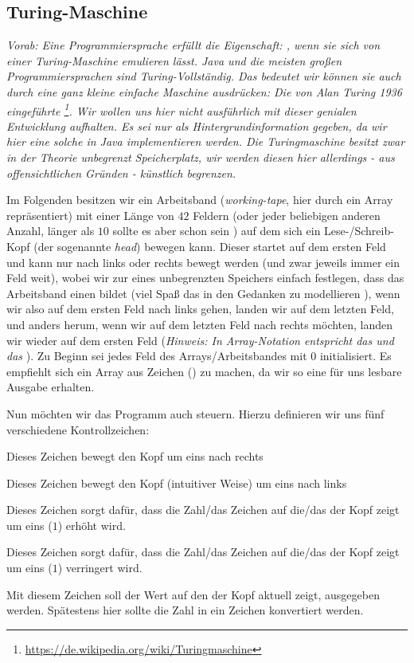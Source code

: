 \documentclass[table]{sopra-base}
\let\T\texttt
\begin{document}
\subsection{Turing-Maschine}
\label{sec:turing}
\textit{Vorab: Eine Programmiersprache erfüllt die Eigenschaft: , wenn sie sich von einer Turing-Maschine emulieren lässt. Java und die meisten großen Programmiersprachen sind Turing-Vollständig. Das bedeutet wir können sie auch durch eine ganz kleine einfache Maschine ausdrücken: Die von Alan Turing 1936 eingeführte \footnote{\url{https://de.wikipedia.org/wiki/Turingmaschine}}. Wir wollen uns hier nicht ausführlich mit dieser genialen Entwicklung aufhalten. Es sei nur als Hintergrundinformation gegeben, da wir hier eine solche in Java implementieren werden. Die Turingmaschine besitzt zwar in der Theorie unbegrenzt Speicherplatz, wir werden diesen hier allerdings - aus offensichtlichen Gründen - künstlich begrenzen.}\par{}

Im Folgenden besitzen wir ein Arbeitsband (\emph{working-tape}, hier durch ein Array repräsentiert) mit einer Länge von $42$ Feldern (oder jeder beliebigen anderen Anzahl, länger als $10$ sollte es aber schon sein \Tongey) auf dem sich ein Lese-/Schreib-Kopf (der sogenannte \emph{head}) bewegen kann. Dieser startet auf dem ersten Feld und kann nur nach links oder rechts bewegt werden (und zwar jeweils immer ein Feld weit), wobei wir zur
 eines unbegrenzten Speichers einfach festlegen, dass das Arbeitsband einen  bildet (viel Spaß das in den Gedanken zu modellieren \Laughey), wenn wir also auf dem ersten Feld nach links gehen, landen wir auf dem letzten Feld, und anders herum, wenn wir auf dem letzten Feld nach rechts möchten, landen wir wieder auf dem ersten Feld (\textit{Hinweis: In Array-Notation entspricht das   und das  }).
Zu Beginn sei jedes Feld des Arrays/Arbeitsbandes mit $0$ initialisiert. Es empfiehlt sich ein Array aus Zeichen () zu machen, da wir so eine für uns lesbare Ausgabe erhalten.\par{}
Nun möchten wir das Programm auch steuern. Hierzu definieren wir uns fünf verschiedene Kontrollzeichen:
\begin{description}[nolistsep]
    \item[\say{\T{>}}] Dieses Zeichen bewegt den Kopf um eins nach rechts
    \item[\say{\T{<}}] Dieses Zeichen bewegt den Kopf (intuitiver Weise) um eins nach links
    \item[\say{\T{+}}] Dieses Zeichen sorgt dafür, dass die Zahl/das Zeichen auf die/das der Kopf zeigt um eins ($1$) erhöht wird.
    \item[\say{\T{-}}] Dieses Zeichen sorgt dafür, dass die Zahl/das Zeichen auf die/das der Kopf zeigt um eins ($1$) verringert wird.
    \item[\say{\T{!}}] Mit diesem Zeichen soll der Wert auf den der Kopf aktuell zeigt, ausgegeben werden. Spätestens hier sollte die Zahl in ein Zeichen konvertiert werden.
\end{description}
\end{document}
